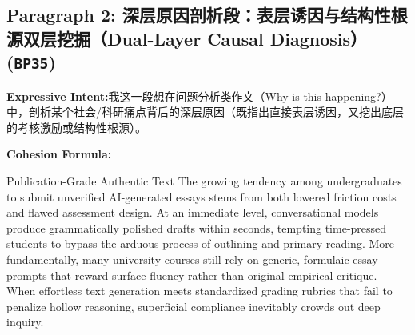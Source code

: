 \subsection*{Paragraph 2: 深层原因剖析段：表层诱因与结构性根源双层挖掘（Dual-Layer Causal Diagnosis） (\texttt{BP35})}
\noindent\textbf{Expressive Intent:}\enspace 我这一段想在问题分析类作文（Why is this happening?）中，剖析某个社会/科研痛点背后的深层原因（既指出直接表层诱因，又挖出底层的考核激励或结构性根源）。\par
\noindent\textbf{Cohesion Formula:}\par\vspace{4pt}
\begin{ExampleBox}{Publication-Grade Authentic Text}
The growing tendency among undergraduates to submit unverified AI-generated essays stems from both lowered friction costs and flawed assessment design. At an immediate level, conversational models produce grammatically polished drafts within seconds, tempting time-pressed students to bypass the arduous process of outlining and primary reading. More fundamentally, many university courses still rely on generic, formulaic essay prompts that reward surface fluency rather than original empirical critique. When effortless text generation meets standardized grading rubrics that fail to penalize hollow reasoning, superficial compliance inevitably crowds out deep inquiry.
\end{ExampleBox}
